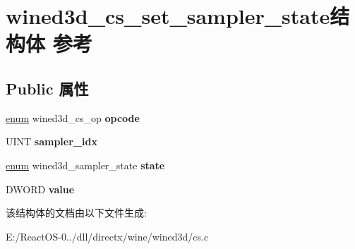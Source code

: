 \hypertarget{structwined3d__cs__set__sampler__state}{}\section{wined3d\+\_\+cs\+\_\+set\+\_\+sampler\+\_\+state结构体 参考}
\label{structwined3d__cs__set__sampler__state}
\subsection*{Public 属性}
\begin{DoxyCompactItemize}
\item 
\mbox{\label{structwined3d__cs__set__sampler__state_a4d3fae5ddbd1999336526d0f9b554d21}} 
\hyperlink{interfaceenum}{enum} wined3d\+\_\+cs\+\_\+op {\bfseries opcode}
\item 
\mbox{\label{structwined3d__cs__set__sampler__state_a586fb6d0b7c02dab2275a9502c95f6f1}} 
U\+I\+NT {\bfseries sampler\+\_\+idx}
\item 
\mbox{\label{structwined3d__cs__set__sampler__state_af8e99e7a4e51139abc8f2e3903ed73f1}} 
\hyperlink{interfaceenum}{enum} wined3d\+\_\+sampler\+\_\+state {\bfseries state}
\item 
\mbox{\label{structwined3d__cs__set__sampler__state_ad057d392cf22f60d537b83851afa211b}} 
D\+W\+O\+RD {\bfseries value}
\end{DoxyCompactItemize}


该结构体的文档由以下文件生成\+:\begin{DoxyCompactItemize}
\item 
E\+:/\+React\+O\+S-\/0../dll/directx/wine/wined3d/cs.\+c\end{DoxyCompactItemize}
